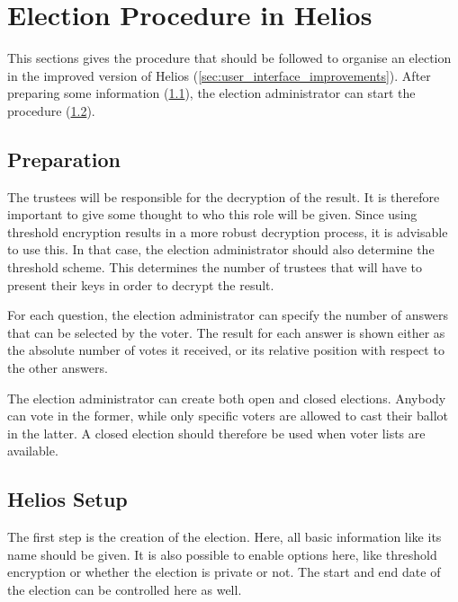 % 
%

\section{Election Procedure in Helios}
\label{sec:procedure}

This sections gives the procedure that should be followed to organise an election in the improved version of Helios (\ref{sec:user_interface_improvements}). After preparing some information (\ref{sec:proc:preparation}), the election administrator can start the procedure (\ref{sec:proc:helios}).

\subsection{Preparation}
\label{sec:proc:preparation}

The trustees will be responsible for the decryption of the result. It is therefore important to give some thought to who this role will be given. Since using threshold encryption results in a more robust decryption process, it is advisable to use this. In that case, the election administrator should also determine the threshold scheme. This determines the number of trustees that will have to present their keys in order to decrypt the result.

\par For each question, the election administrator can specify the number of answers that can be selected by the voter. The result for each answer is shown either as the absolute number of votes it received, or its relative position with respect to the other answers.

\par The election administrator can create both open and closed elections. Anybody can vote in the former, while only specific voters are allowed to cast their ballot in the latter. A closed election should therefore be used when voter lists are available.

\subsection{Helios Setup}
\label{sec:proc:helios}

The first step is the creation of the election. Here, all basic information like its name should be given. It is also possible to enable options here, like threshold encryption or whether the election is private or not. The start and end date of the election can be controlled here as well.

